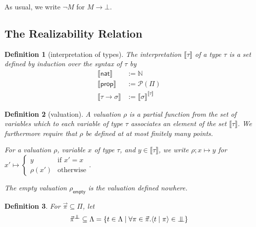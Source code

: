 \documentclass{article}
\newcommand{\N}{\mathbb{N}}
\newcommand{\nat}{\mathsf{nat}}
\newcommand{\proc}[2]{\langle{#1}\mid{#2}\rangle}
\newcommand{\pole}{{\bot\mkern-10mu\bot}}
\newcommand{\prop}{\mathsf{prop}}
\newcommand{\typeinterp}[1]{{\llbracket #1 \rrbracket}}
\newcommand{\powerset}[1]{\mathcal{P}(#1)}
\newcommand{\emptyval}{{\rho_\mathsf{empty}}}
\newtheorem{definition}{Definition}
\begin{document}
As usual, we write $\neg M$ for $M \rightarrow \bot$.

\subsection{The Realizability Relation}

\begin{definition}[interpretation of types]
    The interpretation $\typeinterp{\tau}$ of a type $\tau$ is a set defined by induction over the syntax of $\tau$ by
    \begin{align*}
        \typeinterp{\nat} & := \N \\
        \typeinterp{\prop} & := \powerset{\Pi} \\
        \typeinterp{\tau \rightarrow \sigma} & := \typeinterp{\sigma}^\typeinterp{\tau}
    \end{align*}
\end{definition}

\begin{definition}[valuation]
    A valuation $\rho$ is a partial function from the set of variables which to each variable of type $\tau$ associates an element of the set $\typeinterp{\tau}$. We furthermore require that $\rho$ be defined at at most finitely many points.

    For a valuation $\rho$, variable $x$ of type $\tau$, and $y \in \typeinterp{\tau}$, we write $\rho; x \mapsto y$ for $x' \mapsto \begin{cases} y & \text{if $x' = x$} \\ \rho(x') & \text{otherwise} \end{cases}$.

    The empty valuation $\emptyval$ is the valuation defined nowhere.
\end{definition}

\begin{definition}
    For $\vec\pi \subseteq \Pi$, let
    \[\vec\pi^\pole \subseteq \Lambda = \{ t \in \Lambda \mid \forall \pi \in \vec\pi. \proc{t}{\pi} \in \pole \}\]
\end{definition}
\end{document}
